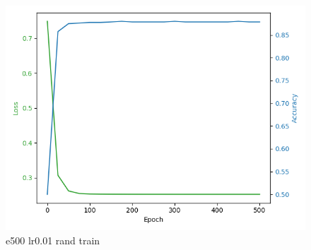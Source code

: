 \documentclass[8pt]{article}
\begin{document}
\begin{figure}[H]
    \begin{minipage}{0.32\textwidth}
        \centering
        \includegraphics[width=\textwidth]{../Prob4/out/1024_173617/e500_lr0.01_btz16_random/training_process.png}
        \caption{e500 lr0.01 rand train}
        \label{fig:e500 lr0.01 rand train}
    \end{minipage}
\end{figure}
\end{document}
